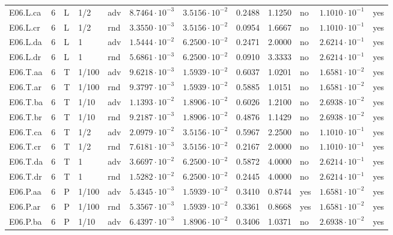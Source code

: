 {\begin{longtable}{@{}lllllllllll l@{}}
E06.L.ca & 6 & L & 1/2 & adv & $8.7464\cdot 10^{-3}$ & $3.5156\cdot 10^{-2}$ & 0.2488 & 1.1250 & no & $1.1010\cdot 10^{-1}$ & yes \\
E06.L.cr & 6 & L & 1/2 & rnd & $3.3550\cdot 10^{-3}$ & $3.5156\cdot 10^{-2}$ & 0.0954 & 1.6667 & no & $1.1010\cdot 10^{-1}$ & yes \\
E06.L.da & 6 & L & 1 & adv & $1.5444\cdot 10^{-2}$ & $6.2500\cdot 10^{-2}$ & 0.2471 & 2.0000 & no & $2.6214\cdot 10^{-1}$ & yes \\
E06.L.dr & 6 & L & 1 & rnd & $5.6861\cdot 10^{-3}$ & $6.2500\cdot 10^{-2}$ & 0.0910 & 3.3333 & no & $2.6214\cdot 10^{-1}$ & yes \\
E06.T.aa & 6 & T & 1/100 & adv & $9.6218\cdot 10^{-3}$ & $1.5939\cdot 10^{-2}$ & 0.6037 & 1.0201 & no & $1.6581\cdot 10^{-2}$ & yes \\
E06.T.ar & 6 & T & 1/100 & rnd & $9.3797\cdot 10^{-3}$ & $1.5939\cdot 10^{-2}$ & 0.5885 & 1.0151 & no & $1.6581\cdot 10^{-2}$ & yes \\
E06.T.ba & 6 & T & 1/10 & adv & $1.1393\cdot 10^{-2}$ & $1.8906\cdot 10^{-2}$ & 0.6026 & 1.2100 & no & $2.6938\cdot 10^{-2}$ & yes \\
E06.T.br & 6 & T & 1/10 & rnd & $9.2187\cdot 10^{-3}$ & $1.8906\cdot 10^{-2}$ & 0.4876 & 1.1429 & no & $2.6938\cdot 10^{-2}$ & yes \\
E06.T.ca & 6 & T & 1/2 & adv & $2.0979\cdot 10^{-2}$ & $3.5156\cdot 10^{-2}$ & 0.5967 & 2.2500 & no & $1.1010\cdot 10^{-1}$ & yes \\
E06.T.cr & 6 & T & 1/2 & rnd & $7.6181\cdot 10^{-3}$ & $3.5156\cdot 10^{-2}$ & 0.2167 & 2.0000 & no & $1.1010\cdot 10^{-1}$ & yes \\
E06.T.da & 6 & T & 1 & adv & $3.6697\cdot 10^{-2}$ & $6.2500\cdot 10^{-2}$ & 0.5872 & 4.0000 & no & $2.6214\cdot 10^{-1}$ & yes \\
E06.T.dr & 6 & T & 1 & rnd & $1.5282\cdot 10^{-2}$ & $6.2500\cdot 10^{-2}$ & 0.2445 & 4.0000 & no & $2.6214\cdot 10^{-1}$ & yes \\
E06.P.aa & 6 & P & 1/100 & adv & $5.4345\cdot 10^{-3}$ & $1.5939\cdot 10^{-2}$ & 0.3410 & 0.8744 & yes & $1.6581\cdot 10^{-2}$ & yes \\
E06.P.ar & 6 & P & 1/100 & rnd & $5.3567\cdot 10^{-3}$ & $1.5939\cdot 10^{-2}$ & 0.3361 & 0.8668 & yes & $1.6581\cdot 10^{-2}$ & yes \\
E06.P.ba & 6 & P & 1/10 & adv & $6.4397\cdot 10^{-3}$ & $1.8906\cdot 10^{-2}$ & 0.3406 & 1.0371 & no & $2.6938\cdot 10^{-2}$ & yes \\

\end{longtable}}
